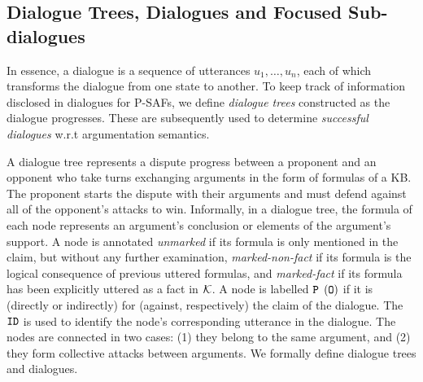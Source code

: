 \subsection{Dialogue Trees, Dialogues and Focused Sub-dialogues}
\label{sec:con-DT}

In essence, a dialogue is a sequence of utterances $u_1, \ldots, u_n$, each of which transforms the dialogue from one state to another.
To keep track of information disclosed in dialogues for P-SAFs, we define \emph{dialogue trees} constructed as the dialogue progresses.  These are subsequently used to determine \emph{successful dialogues} w.r.t argumentation semantics. 

A dialogue tree represents a dispute progress between a proponent and an opponent who take turns exchanging arguments in the form of formulas of a KB.
The proponent starts the dispute with their arguments and must defend against all of the opponent's attacks to win.
%
%
Informally, in a dialogue tree, the formula of each node represents an argument's conclusion or elements of the argument's support. 
%
A node is annotated \emph{unmarked} if its formula is only mentioned in the claim, but without any further examination, \emph{marked-non-fact} if its formula is the logical consequence of previous uttered formulas, and \emph{marked-fact} if its formula has been explicitly uttered as a fact in $\mathcal{K}$.
%
A node is labelled $\texttt{\textup{P}}$ $(\texttt{\textup{O}})$ if it is (directly or indirectly) for (against, respectively) the claim of the dialogue. The $\texttt{\textup{ID}}$ is used to identify the node’s corresponding utterance in the dialogue.
%
The nodes are connected in two cases: (1) they belong to the same argument, and (2) they form collective attacks between arguments. 
 We formally define dialogue trees and dialogues.


